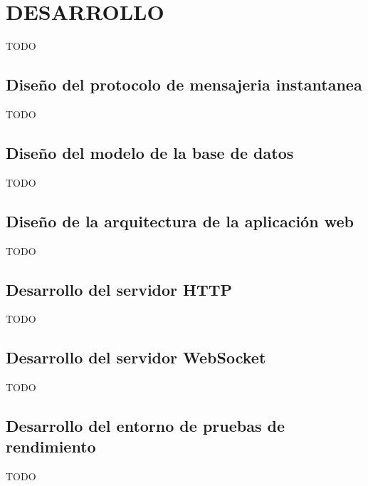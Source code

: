 \chapter{DESARROLLO\label{sec:desarrollo}}

\clearpage

TODO

\section{Diseño del protocolo de mensajeria instantanea}

TODO

\section{Diseño del modelo de la base de datos}

TODO

\section{Diseño de la arquitectura de la aplicación web}

TODO

\section{Desarrollo del servidor HTTP}

TODO

\section{Desarrollo del servidor WebSocket}

TODO

\section{Desarrollo del entorno de pruebas de rendimiento}

TODO
